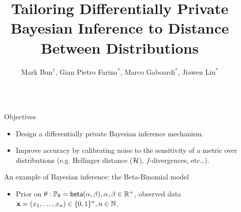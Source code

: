 \documentclass[final,hyperref={pdfpagelabels=false}]{beamer}
\title{\LARGE Tailoring Differentially Private Bayesian Inference to Distance Between Distributions} %
\author{Mark Bun$^\dag$,
Gian Pietro Farina$^{*}$,
Marco Gaboardi$^{*}$,
Jiawen Liu$^{*}$
}
\institute{$^{\dag}$Princeton University, $^{*}$University at Buffalo, SUNY} %
\begin{document}
\begin{frame}[t] %

\begin{columns}[t] %

\begin{column}{.015\textwidth}\end{column} %

\begin{column}{.485\textwidth} %


\begin{block}{Objectives}
\begin{itemize}
\item Design a differentially private Bayesian inference mechanism.
\item Improve accuracy by calibrating noise  to the sensitivity of a
         metric over distributions (e.g. Hellinger distance ($\mathcal{H}$), $f$-divergences, etc\dots).
\end{itemize}
\end{block}

            
\begin{block}{An example of Bayesian inference: the Beta-Binomial model}
\begin{itemize}
  \item  Prior on {\small $\theta: \mathbb{P}_{\theta}= \mathsf{beta}(\alpha, \beta), \alpha,\beta\in\mathbb{R}^{+}$, observed data $\textbf{x}= (x_1,\dots, x_n)\in\{0,1\}^{n}, n\in\mathbb{N}$.}


\end{itemize}
\end{block}
\end{column}
\end{columns}
\end{frame}
\end{document}
